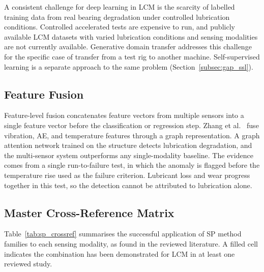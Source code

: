 A consistent challenge for deep learning in LCM is the scarcity of labelled training data from real bearing degradation under controlled lubrication conditions. Controlled accelerated tests are expensive to run, and publicly available LCM datasets with varied lubrication conditions and sensing modalities are not currently available. Generative domain transfer \cite{zhang_interpretable_2026} addresses this challenge for the specific case of transfer from a test rig to another machine. Self-supervised learning is a separate approach to the same problem (Section~\ref{subsec:gap_ssl}).


\subsection{Feature Fusion}
\label{subsec:feature_fusion}
Feature-level fusion concatenates feature vectors from multiple sensors into a single feature vector before the classification or regression step. Zhang et al.\ \cite{zhang_graph-data-based_2024} fuse vibration, AE, and temperature features through a graph representation. A graph attention network trained on the structure detects lubrication degradation, and the multi-sensor system outperforms any single-modality baseline. The evidence comes from a single run-to-failure test, in which the anomaly is flagged before the temperature rise used as the failure criterion. Lubricant loss and wear progress together in this test, so the detection cannot be attributed to lubrication alone.

\subsection{Master Cross-Reference Matrix}
\label{subsec:sp_crossref}

Table~\ref{tab:sp_crossref} summarises the successful application of SP method families to each sensing modality, as found in the reviewed literature. A filled cell indicates the combination has been demonstrated for LCM in at least one reviewed study.

